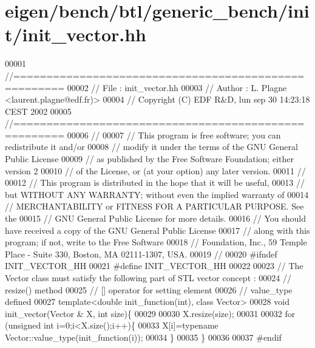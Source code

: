 \hypertarget{eigen_2bench_2btl_2generic__bench_2init_2init__vector_8hh_source}{}\section{eigen/bench/btl/generic\+\_\+bench/init/init\+\_\+vector.hh}
\label{eigen_2bench_2btl_2generic__bench_2init_2init__vector_8hh_source}

\begin{DoxyCode}
00001 \textcolor{comment}{//=====================================================}
00002 \textcolor{comment}{// File   :  init\_vector.hh}
00003 \textcolor{comment}{// Author :  L. Plagne <laurent.plagne@edf.fr)>}
00004 \textcolor{comment}{// Copyright (C) EDF R&D,  lun sep 30 14:23:18 CEST 2002}
00005 \textcolor{comment}{//=====================================================}
00006 \textcolor{comment}{//}
00007 \textcolor{comment}{// This program is free software; you can redistribute it and/or}
00008 \textcolor{comment}{// modify it under the terms of the GNU General Public License}
00009 \textcolor{comment}{// as published by the Free Software Foundation; either version 2}
00010 \textcolor{comment}{// of the License, or (at your option) any later version.}
00011 \textcolor{comment}{//}
00012 \textcolor{comment}{// This program is distributed in the hope that it will be useful,}
00013 \textcolor{comment}{// but WITHOUT ANY WARRANTY; without even the implied warranty of}
00014 \textcolor{comment}{// MERCHANTABILITY or FITNESS FOR A PARTICULAR PURPOSE.  See the}
00015 \textcolor{comment}{// GNU General Public License for more details.}
00016 \textcolor{comment}{// You should have received a copy of the GNU General Public License}
00017 \textcolor{comment}{// along with this program; if not, write to the Free Software}
00018 \textcolor{comment}{// Foundation, Inc., 59 Temple Place - Suite 330, Boston, MA  02111-1307, USA.}
00019 \textcolor{comment}{//}
00020 \textcolor{preprocessor}{#ifndef INIT\_VECTOR\_HH}
00021 \textcolor{preprocessor}{#define INIT\_VECTOR\_HH}
00022 
00023 \textcolor{comment}{// The Vector class must satisfy the following part of STL vector concept :}
00024 \textcolor{comment}{//            resize() method}
00025 \textcolor{comment}{//            [] operator for setting element}
00026 \textcolor{comment}{//            value\_type defined}
00027 \textcolor{keyword}{template}<\textcolor{keywordtype}{double} init\_function(\textcolor{keywordtype}{int}), \textcolor{keyword}{class} Vector>
00028 \textcolor{keywordtype}{void} init\_vector(Vector & X, \textcolor{keywordtype}{int} size)\{
00029 
00030   X.resize(size);
00031 
00032   \textcolor{keywordflow}{for} (\textcolor{keywordtype}{unsigned} \textcolor{keywordtype}{int} i=0;i<X.size();i++)\{
00033     X[i]=\textcolor{keyword}{typename} Vector::value\_type(init\_function(i));
00034   \}
00035 \}
00036 
00037 \textcolor{preprocessor}{#endif}
\end{DoxyCode}
